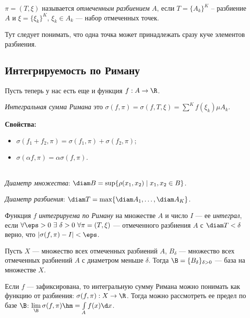 \begin{Def}
$\pi = (T, \xi)$ называется \textit{отмеченным разбиением} $A$, если $T = \{ A_k \}^K$ -- разбиение $A$ и $\xi = \{\xi_k \}^K$, $\xi_k \in A_k$ --- набор отмеченных точек.
\end{Def}

Тут следует понимать, что одна точка может принадлежать сразу куче элементов разбиения.

\subsection{Интегрируемость по Риману}

Пусть теперь у нас есть еще и функция $f: A \to \R$.

\begin{Def}
\textit{Интегральная сумма Римана} это $\sigma(f, \pi) = \sigma(f, T, \xi) = \sum\limits^K f(\xi_k)\mu A_k$.
\end{Def}

\textbf{Свойства:}
\begin{itemize}
\item $\sigma(f_1 + f_2, \pi) = \sigma(f_1, \pi) + \sigma(f_2, \pi)$;
\item $\sigma(\alpha f, \pi) = \alpha \sigma(f, \pi)$.
\end{itemize}

\begin{Def}\ \\
\textit{Диаметр множества}: $\diam B = \sup \{ \rho(x_1, x_2) \mid x_1, x_2 \in B \}$.

\textit{Диаметр разбиения}: $\diam T = \max \{ \diam A_1, \ldots, \diam A_K \}$.
\end{Def}

\begin{Def}
Функция $f$ \textit{интегрируема по Риману} на множестве $A$ и число $I$ --- ее \textit{интеграл}, если
$\forall \eps > 0\ \exists\ \delta > 0\ \forall \pi = (T, \xi)$ --- отмеченного разбиения $A$ с $\diam T < \delta $ верно, что $|\sigma(f, \pi) - I| < \eps$. 
\end{Def}

Пусть $X$ --- множество всех отмеченных разбиений $A$, $B_\delta$ --- множество всех отмеченных разбиений $A$ с диаметром меньше $\delta$. Тогда $\B = \{ B_\delta \}_{\delta > 0}$ --- база на множестве $X$.

Если $f$ --- зафиксирована, то интегральную сумму Римана можно понимать как функцию от разбиения: $\sigma(f, \pi): X \to \R$. Тогда можно рассмотреть ее предел по базе $\B$: $\lim\limits_{\B}\sigma(f, \pi) \hm= \int\limits_{A} f(x) \d x$.

